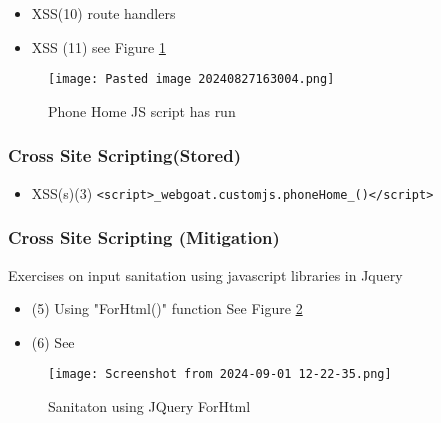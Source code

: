 \documentclass[
	letterpaper, %
	10pt, %
	unnumberedsections, %
	twoside, %
]{APAAssignment}
\begin{document}
\begin{appendices}
\begin{itemize}
\item{XSS(10) route handlers}

\item{XSS (11) see Figure \ref{fig:Result11}}
\end{itemize}


\begin{figure}[!htb] %
	\centering
	\texttt{[image: Pasted image 20240827163004.png]}
	\caption{Phone Home JS script has run}
	\label{fig:Result11}
\end{figure}


\subsubsection{Cross Site Scripting(Stored)}\label{cross-site-scripting-stored}

\begin{itemize}
	\item{XSS(s)(3) \texttt{\textless{}script\textgreater{}\_webgoat.customjs.phoneHome\_()\textless{}/script\textgreater{}}}
\end{itemize}


\subsubsection{Cross Site Scripting (Mitigation)}\label{cross-site-scripting-mitigation}
Exercises on input sanitation using javascript libraries in Jquery

\begin{itemize}
	\item (5) Using "ForHtml()" function See Figure \ref{fig:ForHtml}
	\item (6) See 
\end{itemize}


\begin{figure}[!htb] %
	\centering
	\texttt{[image: Screenshot from 2024-09-01 12-22-35.png]}
	\caption{Sanitaton using JQuery ForHtml}
	\label{fig:ForHtml}
\end{figure}






\end{appendices}
\end{document}
